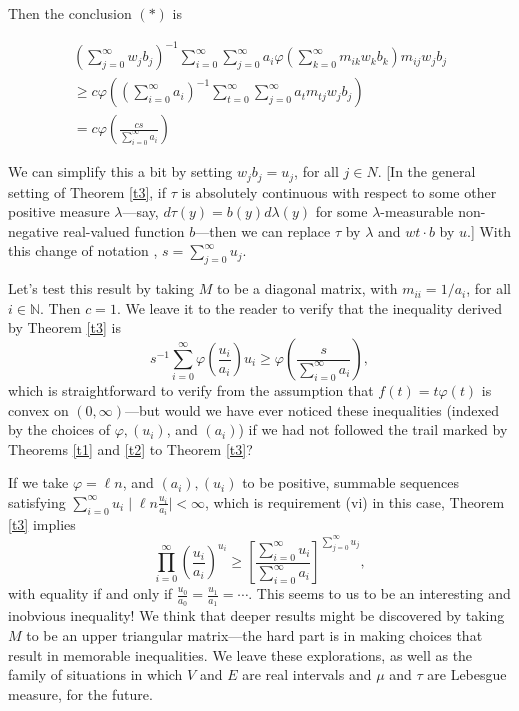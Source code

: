 \documentclass[final,1p,times]{elsarticle}
\begin{document}
Then the conclusion $(*)$ is

$$\begin{array}{c}
(\sum _{j=0}^{\infty} w_j b_j)^{-1} \sum _{i=0}^{\infty} \sum _{j=0}^{\infty} a_i \varphi (\sum _{k = 0}^{\infty} m_{ik} w_k b_k) m_{ij} w_j b_j\\ [.2in]
\geq c \varphi ((\sum _{i=0}^{\infty} a_i)^{-1} \sum _{t=0}^{\infty} \sum _{j=0}^{\infty} a_t m_{tj} w_j b_j)\\  [.2in]
= c \varphi (\frac {cs}{\sum _{i=0}^{\infty} a_i})
\end{array}$$

We can simplify this a bit by setting $w_jb_j = u_j$, for all $j \in N$.  [In the general setting of Theorem \ref {t3}, if $\tau$ is absolutely continuous with respect to some other positive measure $\lambda$---say, $d \tau (y) = b(y) d \lambda (y)$ for some $\lambda$-measurable non-negative real-valued function $b$---then we can replace $\tau$ by $\lambda$ and $wt \cdot b$ by $u$.]  With this change of notation , $s = \sum _{j = 0}^{\infty} u_j$.

Let's test this result by taking $M$ to be a diagonal matrix, with $m_{ii} = 1/a_i$, for all $i \in \mathbb {N}$.  Then $c = 1$.  We leave it to the reader to verify that the inequality derived by Theorem \ref {t3} is 
$$
s^{-1} \sum _{i=0}^{\infty} \varphi \left(\frac {u_i}{a_i}\right) u_i \geq \varphi \left(\frac {s}{\sum _{i=0}^{\infty} a_i}\right),
$$
which is straightforward to verify from the assumption that $f(t) = t \varphi (t)$ is convex on $(0, \infty)$---but would we have ever noticed these inequalities (indexed by the choices of $\varphi, (u_i)$, and $(a_i)$) if we had not followed the trail marked by Theorems \ref {t1} and \ref {t2} to Theorem \ref {t3}?

If we take $\varphi = \ell n$, and $(a_i), (u_i)$ to be positive, summable sequences satisfying $\sum _{i= 0}^{\infty} u_i \mid  \ell n \frac {u_i}{a_i}| < \infty$, which is requirement (vi) in this case, Theorem \ref {t3} implies 
$$
\prod _{i=0}^{\infty} (\frac {u_i}{a_i})^{u_i} \geq \left [ \frac {\sum _{i=0}^{\infty} u_i}{\sum _{i=0}^{\infty} a_i} \right ] ^{\sum _{j=0}^{\infty} u_j},
$$
with equality if and only if $\frac {u_{0}}{a_0} = \frac {u_1}{a_1} = \cdots$.  This seems to us to be an interesting and inobvious inequality!  We think that deeper 
results might be discovered by taking $M$ to be an upper triangular matrix---the hard part is in making choices that result in memorable inequalities.  We leave these explorations, as well as the family of situations in which $V$ and $E$ are real intervals and $\mu$ and $\tau$ are Lebesgue measure, for the future.\\
\end{document}
